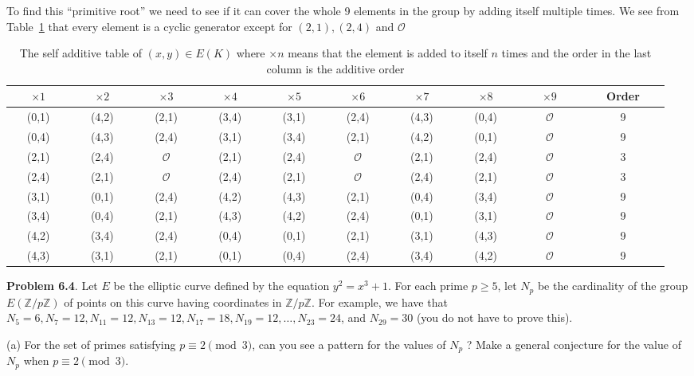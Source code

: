 \documentclass[aps,preprint,preprintnumbers,nofootinbib,showpacs,prd]{revtex4-1}
\begin{document}
To find this ``primitive root'' we need to see if it can cover the whole 9 elements in the group by adding itself multiple times. We see from Table~\ref{Tab:9} that every element is a cyclic generator except for $(2,1),(2,4)$ and $\mathcal{O}$
%
\begin{table}[]
\centering
\caption{The self additive table of $(x,y) \in E(K)$ where $\times n$ means that the element is added to itself $n$ times and the order in the last column is the additive order}
\label{Tab:9}
\begin{tabular}{|c|c|c|c|c|c|c|c|c|c|}
\hline
~~~$\times1$~~~ & ~~~$\times2$~~~ & ~~~$\times3$~~~ & ~~~$\times4$~~~ & ~~~$\times5$~~~ & ~~~$\times6$~~~ & ~~~$\times7$~~~ & ~~~$\times8$~~~ & ~~~$\times9$~~~ & ~~~Order~~~ \\ \hline
(0,1) & (4,2) & (2,1) & (3,4) & (3,1) & (2,4) & (4,3) & (0,4) & $\mathcal{O}$ & 9 \\ \hline
(0,4) & (4,3) & (2,4) & (3,1) & (3,4) & (2,1) & (4,2) & (0,1) & $\mathcal{O}$ & 9 \\ \hline
(2,1) & (2,4) & $\mathcal{O}$ & (2,1) & (2,4) & $\mathcal{O}$ & (2,1) & (2,4) & $\mathcal{O}$ & 3 \\ \hline
(2,4) & (2,1) & $\mathcal{O}$ & (2,4) & (2,1) & $\mathcal{O}$ & (2,4) & (2,1) & $\mathcal{O}$ & 3 \\ \hline
(3,1) & (0,1) & (2,4) & (4,2) & (4,3) & (2,1) & (0,4) & (3,4) & $\mathcal{O}$ & 9 \\ \hline
(3,4) & (0,4) & (2,1) & (4,3) & (4,2) & (2,4) & (0,1) & (3,1) & $\mathcal{O}$ & 9 \\ \hline
(4,2) & (3,4) & (2,4) & (0,4) & (0,1) & (2,1) & (3,1) & (4,3) & $\mathcal{O}$ & 9 \\ \hline
(4,3) & (3,1) & (2,1) & (0,1) & (0,4) & (2,4) & (3,4) & (4,2) & $\mathcal{O}$ & 9 \\ \hline
\end{tabular}
\end{table}
%

{\bf Problem 6.4}. Let $E$ be the elliptic curve defined by the equation $y^2 = x^3 + 1$. For each prime $p \ge 5$, let $N_p$ be the cardinality of the group $E(\mathbb{Z}/p\mathbb{Z})$ of points on this curve having coordinates in $\mathbb{Z}/p\mathbb{Z}$. For example, we have that $N_5 = 6, N_7 = 12, N_{11} = 12, N_{13} = 12, N_{17} = 18, N_{19} =12, \dots , N_{23} = 24$, and $N_{29} = 30$ (you do not have to prove this).

(a) For the set of primes satisfying $p \equiv 2 \pmod{3}$, can you see a pattern for the values of $N_p$ ? Make a general conjecture for the value of $N_p$ when $p \equiv 2 \pmod{3}$.
\end{document}
